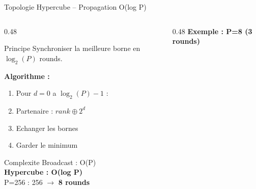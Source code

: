 \documentclass[aspectratio=169,9pt]{beamer}
\begin{document}
\begin{frame}{Topologie Hypercube -- Propagation O(log P)}
    \begin{columns}[T]
        \begin{column}{0.48\textwidth}
            \begin{block}{Principe}
                \small
                Synchroniser la meilleure borne en $\log_2(P)$ rounds.
            \end{block}
            \vspace{0.1cm}
            \textbf{Algorithme :}
            \begin{enumerate}\small
                \item Pour $d = 0$ a $\log_2(P)-1$ :
                \item Partenaire : $rank \oplus 2^d$
                \item Echanger les bornes
                \item Garder le minimum
            \end{enumerate}
            \vspace{0.1cm}
            \begin{alertblock}{Complexite}
                \small
                Broadcast : O(P)\\
                \textbf{Hypercube : O(log P)}\\
                P=256 : 256 $\rightarrow$ \textbf{8 rounds}
            \end{alertblock}
        \end{column}
        \begin{column}{0.48\textwidth}
            \centering
            \textbf{Exemple : P=8 (3 rounds)}\\[0.1cm]
\end{column}
\end{columns}
\end{frame}
\end{document}
